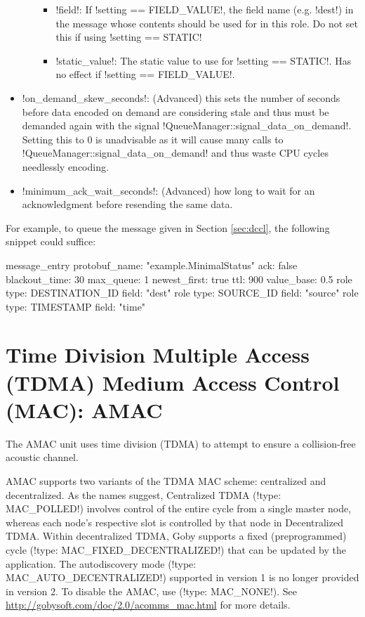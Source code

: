 \begin{itemize}
\begin{itemize}
\begin{itemize}
\item !field!: If !setting == FIELD_VALUE!, the field name (e.g. !dest!) in the message whose contents should be used for in this role. Do not set this if using !setting == STATIC!
\item !static_value!: The static value to use for !setting == STATIC!. Has no effect if !setting == FIELD_VALUE!.
\end{itemize}
\end{itemize}
\item !on_demand_skew_seconds!: (Advanced) this sets the number of seconds before data encoded on demand are considering stale and thus must be demanded again with the signal !QueueManager::signal_data_on_demand!. Setting this to 0 is unadvisable as it will cause many calls to !QueueManager::signal_data_on_demand! and thus waste CPU cycles needlessly encoding.
\item !minimum_ack_wait_seconds!: (Advanced) how long to wait for an acknowledgment before resending the same data.
\end{itemize}

For example, to queue the message given in Section \ref{sec:dccl}, the following snippet could suffice:

\begin{boxedverbatim}
message_entry {
  protobuf_name: "example.MinimalStatus"
  ack: false
  blackout_time: 30
  max_queue: 1
  newest_first: true
  ttl: 900
  value_base: 0.5
  role { type: DESTINATION_ID  field: "dest"   }
  role { type: SOURCE_ID       field: "source" }
  role { type: TIMESTAMP       field: "time"   }
}
\end{boxedverbatim}
\resetbvlinenumber

\section{Time Division Multiple Access (TDMA) Medium Access Control (MAC): AMAC} \label{sec:amac}

The AMAC unit uses time division (TDMA) to attempt to ensure a collision-free acoustic channel.

AMAC supports two variants of the TDMA MAC scheme: centralized and decentralized. As the names suggest, Centralized TDMA (!type: MAC_POLLED!) involves control of the entire cycle from a single master node, whereas each node's respective slot is controlled by that node in Decentralized TDMA. Within decentralized TDMA, Goby supports a fixed (preprogrammed) cycle (!type: MAC_FIXED_DECENTRALIZED!) that can be updated by the application. The autodiscovery mode (!type: MAC_AUTO_DECENTRALIZED!) supported in version 1 is no longer provided in version 2. To disable the AMAC, use (!type: MAC_NONE!). See \url{http://gobysoft.com/doc/2.0/acomms_mac.html} for more details.

